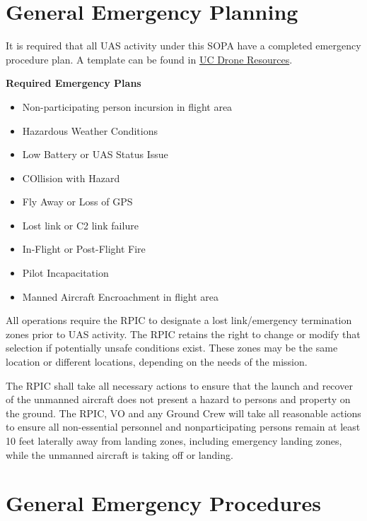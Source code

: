 \documentclass[
]{book}
\providecommand{\tightlist}{%
  \setlength{\itemsep}{0pt}\setlength{\parskip}{0pt}}
\begin{document}
\hypertarget{general-emergency-planning}{%
\section{General Emergency Planning}\label{general-emergency-planning}}

It is required that all UAS activity under this SOPA have a completed emergency procedure plan. A template can be found in \href{https://ucdrones.github.io/ch-resources.html}{UC Drone Resources}.

\textbf{Required Emergency Plans}

\begin{itemize}
\tightlist
\item
  Non-participating person incursion in flight area
\item
  Hazardous Weather Conditions
\item
  Low Battery or UAS Status Issue
\item
  COllision with Hazard
\item
  Fly Away or Loss of GPS
\item
  Lost link or C2 link failure
\item
  In-Flight or Post-Flight Fire
\item
  Pilot Incapacitation
\item
  Manned Aircraft Encroachment in flight area
\end{itemize}

All operations require the RPIC to designate a lost link/emergency termination zones prior to UAS activity. The RPIC retains the right to change or modify that selection if potentially unsafe conditions exist. These zones may be the same location or different locations, depending on the needs of the mission.

The RPIC shall take all necessary actions to ensure that the launch and recover of the unmanned aircraft does not present a hazard to persons and property on the ground. The RPIC, VO and any Ground Crew will take all reasonable actions to ensure all non-essential personnel and nonparticipating persons remain at least 10 feet laterally away from landing zones, including emergency landing zones, while the unmanned aircraft is taking off or landing.

\hypertarget{general-emergency-procedures}{%
\section{General Emergency Procedures}\label{general-emergency-procedures}}
\end{document}
